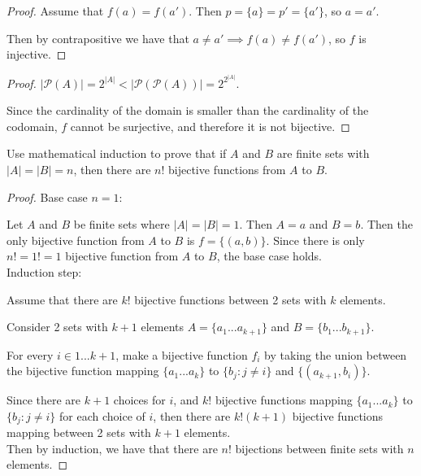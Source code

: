 \documentclass[12 pt]{exam}
\begin{document}
\begin{questions}
\begin{solution}
\begin{proof}
Assume that $f(a) = f(a')$. Then $p = \{a\} = p' = \{a'\}$, so $a = a'$.

Then by contrapositive we have that $a \ne a' \implies f(a) \ne f(a')$, so $f$ is injective.
\end{proof}

\begin{proof}
    $|\mathcal{P}(A)| = 2^{|A|} < |\mathcal{P}(\mathcal{P}(A))| = 2^{2^{|A|}}$.

    Since the cardinality of the domain is smaller than the cardinality of the codomain,
    $f$ cannot be surjective, and therefore it is not bijective.
\end{proof}

\end{solution}

 
 
 \question Use mathematical induction to prove that if $A$ and $B$ are finite sets with $|A|=|B|=n$, then there are $n!$ bijective functions from $A$ to $B$.

\begin{solution}\begin{proof}
Base case $n=1$:

Let $A$ and $B$ be finite sets where $|A| = |B| = 1$. Then $A = {a}$ and $B = {b}$.
Then the only bijective function from $A$ to $B$ is $f = \{(a, b)\}$. Since there is only $n! = 1! = 1$
bijective function from $A$ to $B$, the base case holds.\\


Induction step:

Assume that there are $k!$ bijective functions between 2 sets with $k$ elements.

Consider 2 sets with $k+1$ elements $A = \{a_1 ... a_{k+1}\}$ and $B = \{b_1 ... b_{k+1}\}$.

For every $i \in {1... k+1}$, make a bijective function $f_i$ by taking the union between the
bijective function mapping $\{a_1 ... a_k\}$ to $\{b_j: j \ne i\}$ and $\{(a_{k+1}, b_i)\}$.

Since there are $k+1$ choices for $i$, and
$k!$ bijective functions mapping $\{a_1 ... a_k\}$ to $\{b_j: j \ne i\}$ for each choice of $i$,
then there are $k! (k+1)$ bijective functions mapping between 2 sets with $k+1$ elements.\\

Then by induction, we have that there are $n!$ bijections between finite sets with $n$ elements.

\end{proof}\end{solution}



\end{questions}
\end{document}
